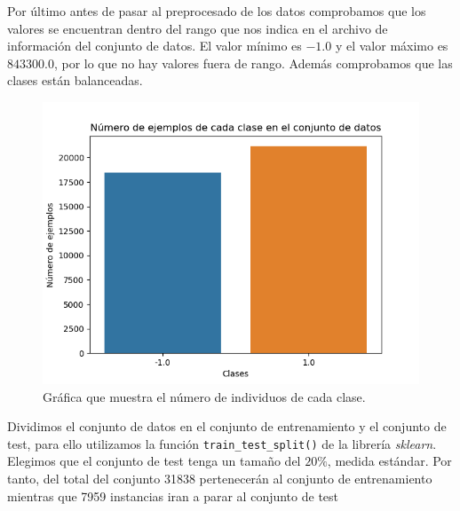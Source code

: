 \documentclass[size=a4, parskip=half, titlepage=false, toc=flat, toc=bib, 12pt]{scrartcl}
\begin{document}
Por último antes de pasar al preprocesado de los datos comprobamos que los valores se encuentran dentro del rango que nos indica en el archivo de información del conjunto de datos. El valor mínimo es $-1.0$ y el valor máximo es $843300.0$, por lo que no hay valores fuera de rango. Además comprobamos que las clases están balanceadas.
\begin{figure}[H]
\centering
\includegraphics[width=1\textwidth]{./img/balanceadas}
\caption{Gráfica que muestra el número de individuos de cada clase.}
\end{figure}

Dividimos el conjunto de datos en el conjunto de entrenamiento y el conjunto de test, para ello utilizamos la función \verb|train_test_split()| de la librería \textit{sklearn}. Elegimos que el conjunto de test tenga un tamaño del $20\%$, medida estándar. Por tanto, del total del conjunto 31838 pertenecerán al conjunto de entrenamiento mientras que 7959 instancias iran a parar al conjunto de test
\end{document}
